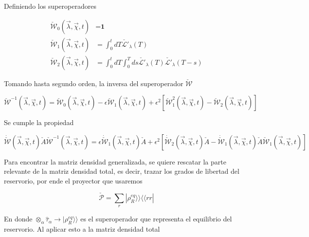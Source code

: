 \begin{appendixs}
Definiendo los superoperadores

\begin{align*}
    \check{\mathcal{W}}_{0}(\vec{\lambda},\vec{\chi},t) &  = \textbf{1}\\
    \check{\mathcal{W}}_{1}(\vec{\lambda},\vec{\chi},t) & = \int_{0}^{t}dT \check{\mathcal{L}'}_{\lambda}(T) \\
    \check{\mathcal{W}}_{2}(\vec{\lambda},\vec{\chi},t) & = \int_{0}^{t}dT \int_{0}^{T}ds \check{\mathcal{L}'}_{\lambda}(T)\check{\mathcal{L}'}_{\lambda}(T-s)
\end{align*}

Tomando hasta segundo orden, la inversa del superoperador $\check{\mathcal{W}}$

\begin{equation}
    \check{\mathcal{W}}^{-1}(\vec{\lambda},\vec{\chi},t) =  \check{\mathcal{W}}_{0}(\vec{\lambda},\vec{\chi},t) - \epsilon  \check{\mathcal{W}}_{1}(\vec{\lambda},\vec{\chi},t) +  \epsilon^{2}[\check{\mathcal{W}}^{2}_{1}(\vec{\lambda},\vec{\chi},t) -  \check{\mathcal{W}}_{2}(\vec{\lambda},\vec{\chi},t) ]
\label{apendix2inverseW}
\end{equation}

Se cumple la propiedad

\begin{equation}
    \dot{\check{\mathcal{W}}}(\vec{\lambda},\vec{\chi},t)\check{A}\check{\mathcal{W}}^{-1}(\vec{\lambda},\vec{\chi},t) = \epsilon \dot{\check{\mathcal{W}}}_{1}(\vec{\lambda},\vec{\chi},t)\check{A} + \epsilon^{2}[\dot{\check{\mathcal{W}}}_{2}(\vec{\lambda},\vec{\chi},t)\check{A} - \dot{\check{\mathcal{W}}}_{1}(\vec{\lambda},\vec{\chi},t)\check{A}\check{\mathcal{W}}_{1}(\vec{\lambda},\vec{\chi},t) ]
    \label{apendix2Wproperty}
\end{equation}

Para encontrar la matriz densidad generalizada, se quiere rescatar la parte relevante de la matriz densidad total, es decir, trazar los grados de libertad del reservorio, por ende el proyector que usaremos

\begin{equation*}
    \check{\mathcal{P}} = \sum_{r}|\rho_{R}^{eq} \rangle \rangle \langle \langle rr|
\end{equation*}

En donde $\otimes_{\alpha} \hat{\tau}_{\alpha} \to  |\rho_{R}^{eq} \rangle \rangle$ es el superoperador que representa el equilibrio del reservorio. Al aplicar esto a la matriz densidad total


\end{appendixs}
